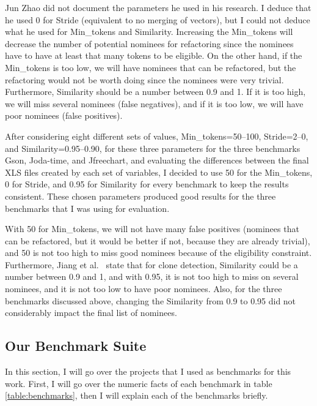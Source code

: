 Jun Zhao did not document the parameters he used in his research. I deduce that he used 0 for {\sc Stride} (equivalent to no merging of vectors), but I could not deduce what he used for {\sc Min\_tokens} and {\sc Similarity}. Increasing the {\sc Min\_tokens} will decrease the number of potential nominees for refactoring since the nominees have to have at least that many tokens to be eligible. On the other hand, if the {\sc Min\_tokens} is too low, we will have nominees that can be refactored, but the refactoring would not be worth doing since the nominees were very trivial. Furthermore, {\sc Similarity} should be a number between 0.9 and 1. If it is too high, we will miss several nominees (false negatives), and if it is too low, we will have poor nominees (false positives).

After considering eight different sets of values, {\sc Min\_tokens}=50--100, {\sc Stride}=2--0, and {\sc Similarity}=0.95--0.90, for these three parameters for the three benchmarks Gson, Joda-time, and Jfreechart, and evaluating the differences between the final XLS files created by each set of variables, I decided to use 50 for the {\sc Min\_tokens}, 0 for {\sc Stride}, and 0.95 for {\sc Similarity} for every benchmark to keep the results consistent. These chosen parameters produced good results for the three benchmarks that I was using for evaluation.

With 50 for {\sc Min\_tokens}, we will not have many false positives (nominees that can be refactored, but it would be better if not, because they are already trivial), and 50 is not too high to miss good nominees because of the eligibility constraint. Furthermore, Jiang et al.~\cite{DECKARD} state that for clone detection, {\sc Similarity} could be a number between 0.9 and 1, and with 0.95, it is not too high to miss on several nominees, and it is not too low to have poor nominees. Also, for the three benchmarks discussed above, changing the Similarity from 0.9 to 0.95 did not considerably impact the final list of nominees.

\subsection{Our Benchmark Suite}

In this section, I will go over the projects that I used as benchmarks for this work. First, I will go over the numeric facts of each benchmark in table \ref{table:benchmarks}, then I will explain each of the benchmarks briefly.

